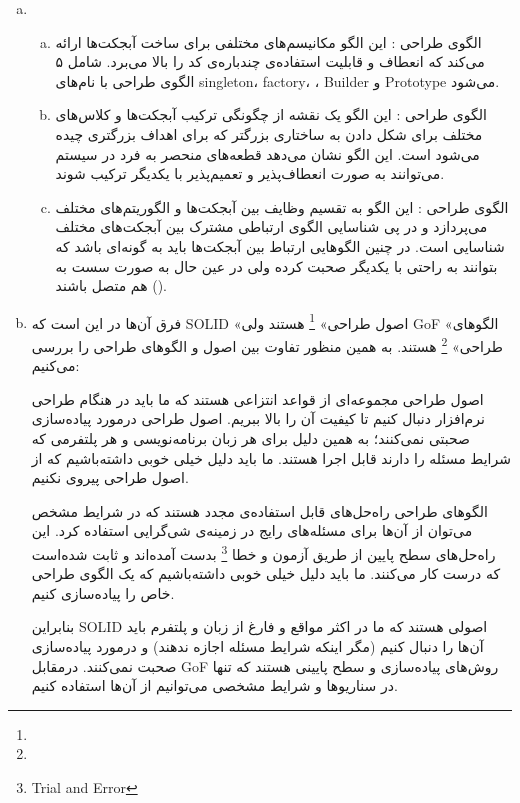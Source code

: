 {\begin{enumerate}[a)]
	\item

\begin{enumerate}[a)]
	\item الگوی طراحی : این الگو مکانیسم‌های مختلفی برای ساخت آبجکت‌ها ارائه می‌کند که انعطاف و قابلیت استفاده‌ی چندباره‌ی کد را بالا می‌برد. شامل ۵ الگوی طراحی با نام‌های singleton، factory، ، ‌Builder و Prototype می‌شود.
	\item الگوی طراحی : این الگو یک نقشه از چگونگی ترکیب آبجکت‌ها و کلاس‌‌های مختلف برای شکل دادن به ساختاری بزرگتر که برای اهداف بزرگتری چیده می‌شود است. این الگو نشان می‌دهد قطعه‌های منحصر به فرد در سیستم می‌توانند به صورت انعطاف‌پذیر و تعمیم‌پذیر با یکدیگر ترکیب شوند.
 	\item الگوی طراحی : این الگو به تقسیم وظایف بین آبجکت‌ها و الگوریتم‌های مختلف می‌پردازد و در پی شناسایی الگوی ارتباطی مشترک بین آبجکت‌های مختلف شناسایی است. در چنین الگوهایی ارتباط بین آبجکت‌ها باید به گونه‌ای باشد که بتوانند به راحتی با یکدیگر صحبت کرده ولی در عین حال به صورت سست به هم متصل باشند ().
\end{enumerate}

 	\item
فرق آن‌ها در این است که SOLID «اصول طراحی» \footnote{} هستند ولی GoF «الگوهای طراحی» \footnote{} هستند. به همین منظور تفاوت بین اصول و الگوهای طراحی را بررسی می‌کنیم:

اصول طراحی مجموعه‌ای از قواعد انتزاعی هستند که ما باید در هنگام طراحی نرم‌افزار دنبال کنیم تا کیفیت آن را بالا ببریم. اصول طراحی درمورد پیاده‌سازی صحبتی نمی‌کنند؛ به همین دلیل برای هر زبان برنامه‌نویسی و هر پلتفرمی که شرایط مسئله را دارند قابل اجرا هستند. ما باید دلیل خیلی خوبی داشته‌باشیم که از اصول طراحی پیروی نکنیم.

الگوهای طراحی راه‌حل‌های قابل استفاده‌ی مجدد هستند که در شرایط مشخص می‌توان از آن‌ها برای مسئله‌های رایج در زمینه‌ی شی‌گرایی استفاده کرد. این راه‌حل‌های سطح پایین از طریق آزمون و خطا \footnote{Trial and Error} بدست آمده‌اند و ثابت شده‌است که درست کار می‌کنند. ما باید دلیل خیلی خوبی داشته‌باشیم که یک الگوی طراحی خاص را پیاده‌سازی کنیم.

بنابراین SOLID اصولی هستند که ما در اکثر مواقع و فارغ از زبان و پلتفرم باید آن‌ها را دنبال کنیم (مگر اینکه شرایط مسئله اجازه ندهند) و درمورد پیاده‌سازی صحبت نمی‌کنند. درمقابل GoF روش‌های پیاده‌سازی‌ و سطح پایینی هستند که تنها در سناریو‌ها و شرایط مشخصی می‌توانیم از آن‌ها استفاده کنیم.
\end{enumerate}
}
